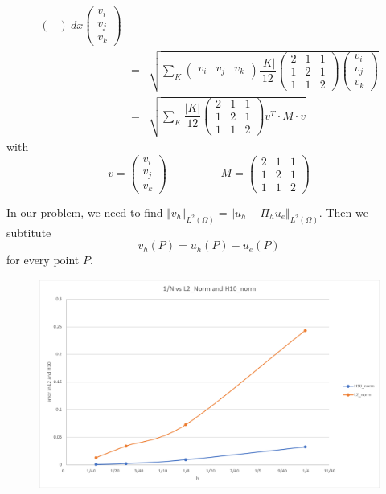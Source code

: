 \documentclass[a4paper,10pt]{article}
\begin{document}
\begin{eqnarray}
{\begin{pmatrix}
	\end{pmatrix}
	\ dx
	\begin{pmatrix}
	v_{i} \\ v_{j} \\ v_{k}
	\end{pmatrix}} \\ \nonumber
&=& \sqrt{ \sum_{K}
	\begin{pmatrix}
	v_{i} & v_{j} & v_{k}
	\end{pmatrix}
	\dfrac{\vert K \vert}{12}
	\begin{pmatrix}
	2 & 1 & 1 \\ 1 & 2 & 1 \\ 1 & 1 & 2
	\end{pmatrix}
	\begin{pmatrix}
	v_{i} \\ v_{j} \\ v_{k}
	\end{pmatrix}} \\ \nonumber
&=& \sqrt{ \sum_{K}
	\dfrac{\vert K \vert}{12}
	\begin{pmatrix}
	2 & 1 & 1 \\ 1 & 2 & 1 \\ 1 & 1 & 2
	\end{pmatrix}
	v^{T} \cdot M \cdot v
	}
\end{eqnarray}
with
\[ v = \begin{pmatrix}
v_{i} \\ v_{j} \\ v_{k}
\end{pmatrix} \hspace{2cm}
M = \begin{pmatrix}
2 & 1 & 1 \\ 1 & 2 & 1 \\ 1 & 1 & 2
\end{pmatrix}  \]

In our problem, we need to find $ \Vert v_{h} \Vert_{L^2(\Omega)} = \Vert u_{h} - \Pi_{h}u_{e} \Vert_{L^2(\Omega)} $. Then we subtitute
\[ v_{h}(P) = u_{h}(P) - u_{e}(P) \]
for every point $ P $.

\begin{figure}[h!]
	\centering
	\includegraphics[width=0.7\linewidth]{picture/grafik2}
	\caption{}
	\label{fig:grafik2}
\end{figure}
\end{document}
